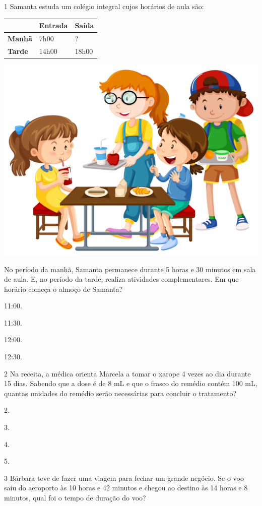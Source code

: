\num{1} Samanta estuda um colégio integral cujos horários de aula são:  

\begin{longtable}[]{@{}lll@{}}
\toprule
& \textbf{Entrada} & \textbf{Saída}\tabularnewline
\midrule
\endhead
\textbf{Manhã} & 7h00 & ?\tabularnewline
\textbf{Tarde} & 14h00 & 18h00\tabularnewline
\bottomrule
\end{longtable}

\begin{center}
\includegraphics[width=.4\textwidth]{media/image24e.jpeg}
\end{center}

No período da manhã, Samanta permanece durante 5 horas e 30 minutos em sala de aula. 
E, no período da tarde, realiza atividades complementares.
Em que horário começa o almoço de Samanta?

\begin{multicols}{2}
\begin{escolha}
\item
  11:00.
\item
  11:30.
\item
  12:00.
\item
  12:30.
\end{escolha}
\end{multicols}

\num{2} Na receita, a médica orienta Marcela a tomar o xarope 4 vezes ao
dia durante 15 dias. Sabendo que a dose é de 8 mL e que o frasco do remédio
contém 100 mL, quantas unidades do remédio serão necessárias para concluir o 
tratamento? 

\begin{multicols}{2}
\begin{escolha}
\item
  2.
\item
  3.
\item
  4.
\item
  5.
\end{escolha}
\end{multicols}

\num{3} Bárbara teve de fazer uma viagem para fechar um grande negócio. Se o voo
saiu do aeroporto às 10 horas e 42 minutos e chegou ao destino às 14
horas e 8 minutos, qual foi o tempo de duração do voo?

